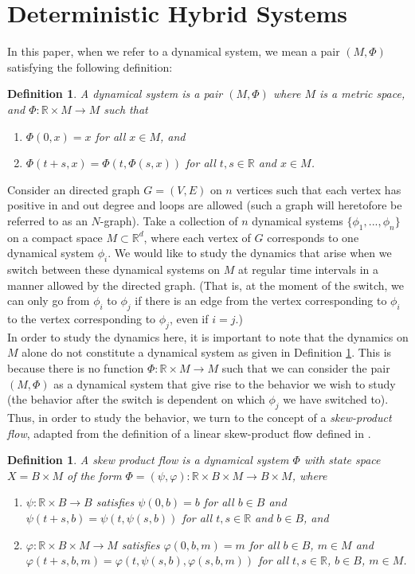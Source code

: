 \documentclass[11pt]{article}
\newtheorem{defn}[thm]{Definition}
\begin{document}
\section{Deterministic Hybrid Systems}

In this paper, when we refer to a dynamical system, we mean a pair $(M, \Phi)$ satisfying the following definition:
\begin{defn}\label{dynsys}
A dynamical system is a pair $(M, \Phi)$ where $M$ is a metric space, and $\Phi:\mathbb{R}\times M\rightarrow M$ such that
\begin{enumerate}
\item $\Phi(0,x)=x$ for all $x\in M$, and
\item $\Phi(t+s,x)=\Phi(t,\Phi(s,x))$ for all $t,s \in \mathbb{R}$ and $x\in M$.
\end{enumerate}

\end{defn}
\indent Consider an directed graph $G=(V,E)$ on $n$ vertices such that each vertex has positive in and out degree and loops are allowed (such a graph will heretofore be referred to as an $N$-graph).  Take a collection of $n$ dynamical systems $\{\phi_1,...,\phi_n\}$ on a compact space $M \subset \mathbb{R}^d$, where each vertex of $G$ corresponds to one dynamical system $\phi_i$.  We would like to study the dynamics that arise when we switch between these dynamical systems on $M$ at regular time intervals in a manner allowed by the directed graph. (That is, at the moment of the switch, we can only go from $\phi_i$ to $\phi_j$ if there is an edge from the vertex corresponding to $\phi_i$ to the vertex corresponding to $\phi_j$, even if $i=j$.) \\
\indent In order to study the dynamics here, it is important to note that the dynamics on $M$ alone do not constitute a dynamical system as given in Definition \ref{dynsys}.  This is because there is no function $\Phi:\mathbb{R}\times M\rightarrow M$ such that we can consider the pair $(M,\Phi)$ as a dynamical system that give rise to the behavior we wish to study (the behavior after the switch is dependent on which $\phi_j$ we have switched to).  Thus, in order to study the behavior, we turn to the concept of a \emph{skew-product flow}, adapted from the definition of a linear skew-product flow defined in \cite{skewproduct}.
\begin{defn}\label{skewproduct}
A skew product flow is a dynamical system $\Phi$ with state space $X=B\times M$ of the form $\Phi=(\psi,\varphi):\mathbb{R}\times B\times M\rightarrow B\times M$, where 
\begin{enumerate}
\item $\psi:\mathbb{R}\times B\rightarrow B$ satisfies $\psi(0,b)=b$ for all $b\in B$ and $\psi(t+s,b)=\psi(t,\psi(s,b))$ for all $t,s\in\mathbb{R}$ and $b\in B$, and 
\item$\varphi:\mathbb{R}\times B\times M\rightarrow M$ satisfies $\varphi(0,b,m)=m$ for all $b\in B$, $m\in M$ and $\varphi(t+s,b,m)=\varphi(t,\psi(s,b),\varphi(s,b,m))$ for all $t,s\in\mathbb{R}$, $b\in B$, $m\in M$. 
\end{enumerate}
\end{defn} 
\end{document}
